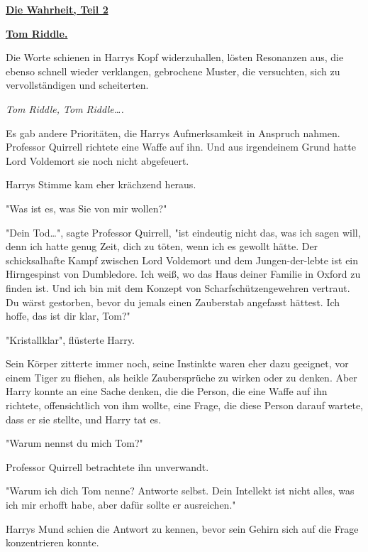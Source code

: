 

\hypertarget{die-wahrheit-teil-2}{%

\textbf{\uline{Die Wahrheit, Teil 2}}

\textbf{\uline{Tom Riddle.}}

Die Worte schienen in Harrys Kopf widerzuhallen, lösten Resonanzen aus, die ebenso schnell wieder verklangen, gebrochene Muster, die versuchten, sich zu vervollständigen und scheiterten.

\emph{Tom Riddle, Tom Riddle….}

Es gab andere Prioritäten, die Harrys Aufmerksamkeit in Anspruch nahmen. Professor Quirrell richtete eine Waffe auf ihn. Und aus irgendeinem Grund hatte Lord Voldemort sie noch nicht abgefeuert.

Harrys Stimme kam eher krächzend heraus.

"Was ist es, was Sie von mir wollen?"

"Dein Tod…", sagte Professor Quirrell, "ist eindeutig nicht das, was ich sagen will, denn ich hatte genug Zeit, dich zu töten, wenn ich es gewollt hätte. Der schicksalhafte Kampf zwischen Lord Voldemort und dem Jungen-der-lebte ist ein Hirngespinst von Dumbledore. Ich weiß, wo das Haus deiner Familie in Oxford zu finden ist. Und ich bin mit dem Konzept von Scharfschützengewehren vertraut. Du wärst gestorben, bevor du jemals einen Zauberstab angefasst hättest. Ich hoffe, das ist dir klar, Tom?"

"Kristallklar", flüsterte Harry.

Sein Körper zitterte immer noch, seine Instinkte waren eher dazu geeignet, vor einem Tiger zu fliehen, als heikle Zaubersprüche zu wirken oder zu denken. Aber Harry konnte an eine Sache denken, die die Person, die eine Waffe auf ihn richtete, offensichtlich von ihm wollte, eine Frage, die diese Person darauf wartete, dass er sie stellte, und Harry tat es.

"Warum nennst du mich Tom?"

Professor Quirrell betrachtete ihn unverwandt.

"Warum ich dich Tom nenne? Antworte selbst. Dein Intellekt ist nicht alles, was ich mir erhofft habe, aber dafür sollte er ausreichen."

Harrys Mund schien die Antwort zu kennen, bevor sein Gehirn sich auf die Frage konzentrieren konnte.

}
